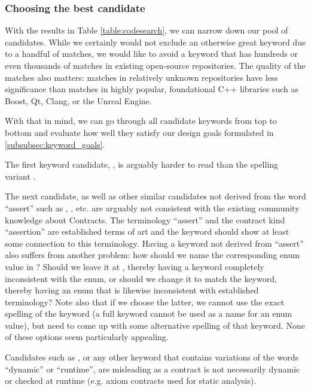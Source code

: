 
\subsubsection{Choosing the best candidate}

With the results in Table \ref{table:codesearch}, we can narrow down our pool of candidates. While we certainly would not exclude an otherwise great keyword due to a handful of matches, we would like to avoid a keyword that has hundreds or even thousands of matches in existing open-source repositories. The quality of the matches also matters: matches in relatively unknown repositories have less significance than matches in highly popular, foundational C++ libraries such as Boost, Qt, Clang, or the Unreal Engine.

With that in mind, we can go through all candidate keywords from top to bottom and evaluate how well they satisfy our design goals formulated in \ref{subsubsec:keyword_goals}.

The first keyword candidate, , is arguably harder to read than the spelling variant \mbox{}.

The next candidate,  as well as other similar candidates not derived from the word ``assert'' such as , , etc. are arguably not consistent with the existing community knowledge about Contracts. The terminology ``assert'' and the contract kind ``assertion'' are established terms of art and the keyword should show at least some connection to this terminology. Having a keyword not derived from ``assert'' also suffers from another problem: how should we name the corresponding enum value in \mbox{}? Should we leave it at , thereby having a keyword completely inconsistent with the enum, or should we change it to match the keyword, thereby having an enum that is likewise inconsistent with established terminology? Note also that if we choose the latter, we cannot use the exact spelling of the keyword (a full keyword cannot be used as a name for an enum value), but need to come up with some alternative spelling of that keyword. None of these options seem particularly appealing.

Candidates such as , or any other keyword that contains variations of the words ``dynamic'' or ``runtime'', are misleading as a contract is not necessarily dynamic or checked at runtime (e.g. axiom contracts used for static analysis).

